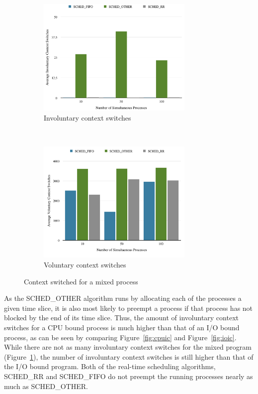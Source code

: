 \documentclass[12pt]{article}
\begin{document}
\begin{figure}[!htb]
  \centering
  \begin{subfigure}[t]{0.4\textwidth}
    \centering
    \includegraphics[width=75mm]{MixIC.png}
    \caption{Involuntary context switches}
    \label{fig:mixic}
  \end{subfigure}
  ~
  \begin{subfigure}[t]{0.4\textwidth}
    \centering
    \includegraphics[width=75mm]{MixVC.png}
    \caption{Voluntary context switches}
    \label{fig:mixvc}
  \end{subfigure}
  \caption{Context switched for a mixed process}
\end{figure}

As the {\ttfamily SCHED\_OTHER} algorithm runs by allocating each of the 
processes a given time slice, it is also most likely to preempt a process if
that process has not blocked by the end of its time slice. Thus, the amount
of involuntary context switches for a CPU bound process is much higher than
that of an I/O bound process, as can be seen by comparing Figure~\ref{fig:cpuic}
and Figure~\ref{fig:ioic}. While there are not as many involuntary context
switches for the mixed program (Figure~\ref{fig:mixic}), the number of 
involuntary context switches is still higher than that of the I/O bound program.
Both of the real-time scheduling algorithms, {\ttfamily SCHED\_RR} and 
{\ttfamily SCHED\_FIFO} do not preempt the running processes nearly as much as
{\ttfamily SCHED\_OTHER}.
\end{document}
